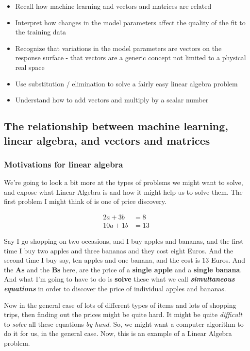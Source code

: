 \documentclass[]{article}
\begin{document}
\begin{itemize}
	\item Recall how machine learning and vectors and matrices are related
	\item Interpret how changes in the model parameters affect the quality of the fit to the training data
	\item Recognize that variations in the model parameters are vectors on the response surface - that vectors are a generic concept not limited to a physical real space
	\item Use substitution / elimination to solve a fairly easy linear algebra problem
	\item Understand how to add vectors and multiply by a scalar number
\end{itemize}

\subsection{The relationship between machine learning, linear algebra, and vectors and matrices}

\subsubsection{Motivations for linear algebra}

We're going to look a bit more at the types of problems we might want to solve, and expose what Linear Algebra is and how it might help us to solve them.
The first problem I might think of is one of price discovery.

\begin{equation} \label{eq1}
\begin{split}
2a + 3b & = 8 \\
10a + 1b & = 13
\end{split}
\end{equation}

Say I go shopping on two occasions, and I buy apples and bananas, and the first time I buy two apples and three bananas and they cost eight Euros.
And the second time I buy say, ten apples and one banana, and the cost is 13 Euros.
And the \textbf{As} and the \textbf{Bs} here,
are the price of a \textbf{single apple} and a \textbf{single banana}.
And what I'm going to have to do is \textbf{solve} these what we call \textbf{\textit{simultaneous equations}} in order to discover the price of individual apples and bananas.

Now in the general case of lots of different types of items and lots of shopping trips, then finding out the prices might be quite hard. It might be quite \textit{difficult} to \textit{solve} all these equations \textit{by hand}. So, we might want a computer algorithm to do it for us, in the general case. Now, this is an example of a Linear Algebra problem.
\end{document}
